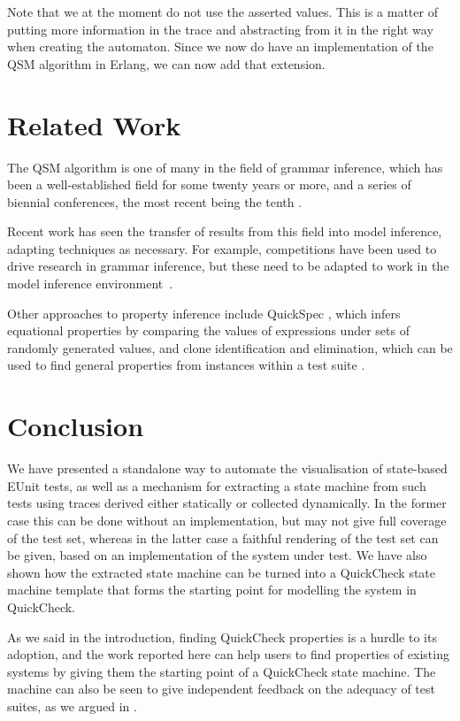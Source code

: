 \documentclass[]{sigplanconf}
\begin{document}
Note that we at the moment do not use the asserted values. This is a matter of putting more information in the trace and abstracting from it in the right way when creating the automaton. 
Since we now do have an implementation of the QSM algorithm in Erlang, we can now
add that extension.

\section{Related Work}
\label{RelatedWork}

The QSM algorithm is one of many in the field of grammar inference, which has been a well-established field for some twenty years or more, and a series of biennial conferences, the most recent being the tenth \cite{inference}.

Recent work has seen the transfer of results from this field into model inference, adapting techniques as necessary. For example, competitions have been used to drive research in grammar inference, but these need to be adapted to work in the model inference environment~\cite{STAMINA}. 

Other approaches to property inference include QuickSpec \cite{QuickSpec}, which infers equational properties by comparing the values of expressions under sets of randomly generated values, and clone identification and elimination, which can be used to find general properties from instances within a test suite \cite{RefTest2011}.


\section{Conclusion}
\label{conc}


We have presented a standalone way to automate the visualisation
of state-based EUnit tests, as well as a mechanism for extracting a state machine from such tests using traces derived either statically or collected dynamically. In the former case this can be done without an implementation, but may not give full coverage of the test set, whereas in the latter case a faithful rendering of the test set can be given, based on an implementation of the system under test.
We have also shown how the extracted state machine can be turned into a QuickCheck state machine template that forms the starting point for modelling the system in QuickCheck. 

As we said in the introduction, finding QuickCheck properties is a hurdle to its adoption, and the work reported here can help users to find properties of existing systems by giving them the starting point of a QuickCheck state machine. The machine can also be seen to give independent feedback on the adequacy of test suites, as we argued in \cite{arts2010test}.
\end{document}
